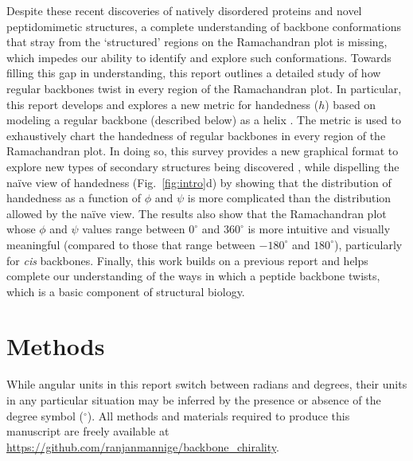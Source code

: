 \documentclass[fleqn,10pt,lineno]{wlpeerj} %
\newcommand{\n}[1]{{\color{blue}#1}}
\newcommand{\Fig}[1]{Fig.~\ref{#1}}
\newcommand{\h}{h}
\newcommand{\cis}{{\em cis}\xspace}
\begin{document}
\n{Despite these recent discoveries of natively disordered proteins and novel peptidomimetic structures, a complete understanding of backbone conformations that stray from the `structured' regions on the Ramachandran plot is missing, which impedes our ability to identify and explore such conformations. Towards filling this gap in understanding, this report outlines a detailed study of how regular backbones twist in every region of the Ramachandran plot. In particular, this report develops and explores a new metric for handedness ($\h$) based on modeling a regular backbone (described below) as a helix \citep{Shimanouchi1955,Miyazawa1961,Zacharias2013}. The metric is used to exhaustively chart the handedness of regular backbones in every region of the Ramachandran plot. In doing so, this survey provides a new graphical format to explore new types of secondary structures being discovered \citep{Mannige2015,Gorske2016}, while dispelling the na{\"i}ve view of handedness (\Fig{fig:intro}d) by showing that the distribution of handedness as a function of $\phi$ and $\psi$ is more complicated than the distribution allowed by the na{\"i}ve view. The results also show that the Ramachandran plot whose $\phi$ and $\psi$ values range between $0^\circ$ and $360^\circ$ is more intuitive and visually meaningful (compared to those that range between $-180^\circ$ and $180^\circ$), particularly for \cis backbones. Finally, this work builds on a previous report \citep{Zacharias2013} and helps complete our understanding of the ways in which a peptide backbone twists, which is a basic component of structural biology.}

\section*{Methods}
\n{While angular units in this report switch between radians and degrees, their units in any particular situation may be inferred by the presence or absence of the degree symbol ($^\circ$).} All methods and materials required to produce this manuscript are freely available at \url{https://github.com/ranjanmannige/backbone_chirality}.
\end{document}
